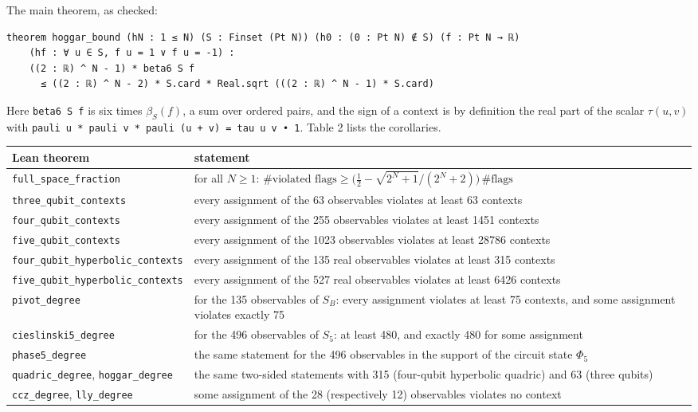 \documentclass[11pt,a4paper]{article}
\begin{document}
The main theorem, as checked:

\begin{verbatim}
theorem hoggar_bound (hN : 1 ≤ N) (S : Finset (Pt N)) (h0 : (0 : Pt N) ∉ S) (f : Pt N → ℝ)
    (hf : ∀ u ∈ S, f u = 1 ∨ f u = -1) :
    ((2 : ℝ) ^ N - 1) * beta6 S f
      ≤ ((2 : ℝ) ^ N - 2) * S.card * Real.sqrt (((2 : ℝ) ^ N - 1) * S.card)
\end{verbatim}

Here \texttt{beta6\ S\ f} is six times \(\beta_S(f)\), a sum over ordered pairs, and the sign of a context is by
definition the real part of the scalar \(\tau(u,v)\) with \texttt{pauli\ u\ *\ pauli\ v\ *\ pauli\ (u\ +\ v)\ =\ tau\ u\ v\ •\ 1}.
Table 2 lists the corollaries.

{\def\LTcaptype{none} %
{\small
\begin{longtable}[]{@{}>{\raggedright\arraybackslash}p{}>{\raggedright\arraybackslash}p{}@{}}
\toprule\noalign{}
Lean theorem & statement \\
\midrule\noalign{}
\endhead
\bottomrule\noalign{}
\endlastfoot
\texttt{full\_space\_fraction} & for all \(N \ge 1\): \(\#\text{violated flags} \ge \big(\tfrac12 - \sqrt{2^N+1}/(2^N+2)\big)\,\#\text{flags}\) \\
\texttt{three\_qubit\_contexts} & every assignment of the 63 observables violates at least 63 contexts \\
\texttt{four\_qubit\_contexts} & every assignment of the 255 observables violates at least 1451 contexts \\
\texttt{five\_qubit\_contexts} & every assignment of the 1023 observables violates at least 28786 contexts \\
\texttt{four\_qubit\_hyperbolic\_contexts} & every assignment of the 135 real observables violates at least 315 contexts \\
\texttt{five\_qubit\_hyperbolic\_contexts} & every assignment of the 527 real observables violates at least 6426 contexts \\
\texttt{pivot\_degree} & for the 135 observables of \(S_B\): every assignment violates at least 75 contexts, and some assignment violates exactly 75 \\
\texttt{cieslinski5\_degree} & for the 496 observables of \(S_5\): at least 480, and exactly 480 for some assignment \\
\texttt{phase5\_degree} & the same statement for the 496 observables in the support of the circuit state \(\Phi_5\) \\
\texttt{quadric\_degree}, \texttt{hoggar\_degree} & the same two-sided statements with 315 (four-qubit hyperbolic quadric) and 63 (three qubits) \\
\texttt{ccz\_degree}, \texttt{lly\_degree} & some assignment of the 28 (respectively 12) observables violates no context \\
\end{longtable}
}
}
\end{document}
